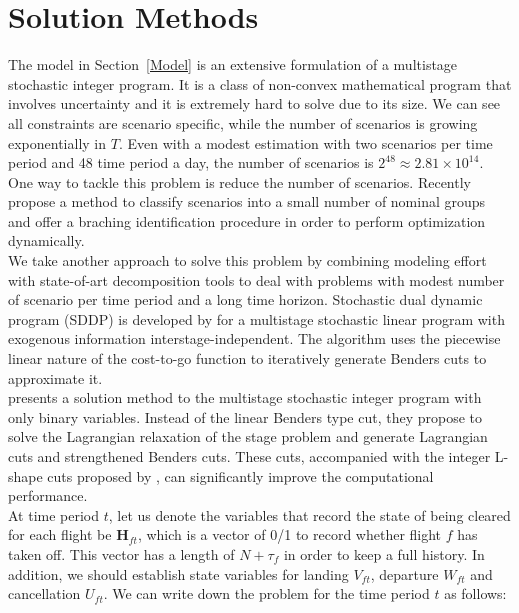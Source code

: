 \documentclass[12pt]{article}
\begin{document}
\section{Solution Methods}
	The model in Section~\ref{Model} is an extensive formulation of a multistage stochastic integer program. It is a class of non-convex mathematical program that involves uncertainty and it is extremely hard to solve due to its size. We can see all constraints are scenario specific, while the number of scenarios is growing exponentially in \(T\). Even with a modest estimation with two scenarios per time period and 48 time period a day, the number of scenarios is \(2^{48} \approx 2.81\times 10^{14}\). One way to tackle this problem is reduce the number of scenarios. Recently \cite{liu2008scenario} propose a method to classify scenarios into a small number of nominal groups and offer a braching identification procedure in order to perform optimization dynamically.\\
	\newline
	We take another approach to solve this problem by combining modeling effort with state-of-art decomposition tools to deal with problems with modest number of scenario per time period and a long time horizon. Stochastic dual dynamic program (SDDP) is developed by \cite{pereira1991multi} for a multistage stochastic linear program with exogenous information interstage-independent. The algorithm uses the piecewise linear nature of the cost-to-go function to iteratively generate Benders cuts to approximate it.\\
	\newline \cite{zou2016nested} presents a solution method to the multistage stochastic integer program with only binary variables. Instead of the linear Benders type cut, they propose to solve the Lagrangian relaxation of the stage problem and generate Lagrangian cuts and strengthened Benders cuts. These cuts, accompanied with the integer L-shape cuts proposed by \cite{laporte1993integer}, can significantly improve the computational performance.\\
	\newline At time period \(t\), let us denote the variables that record the state of being cleared for each flight be \(\mathbf{H}_{ft}\), which is a vector of 0/1 to record whether flight \(f\) has taken off. This vector has a length of \(N + \tau_f\) in order to keep a full history. In addition, we should establish state variables for landing \(V_{ft}\), departure \(W_{ft}\) and cancellation \(U_{ft}\). We can write down the problem for the time period \(t\) as follows:
\end{document}
